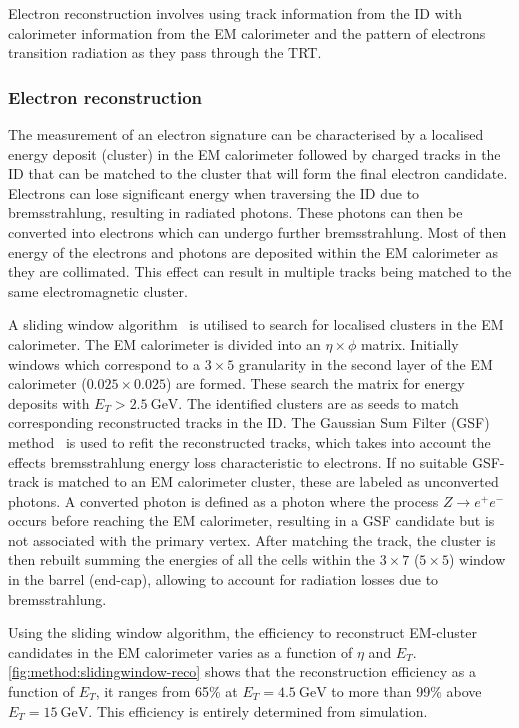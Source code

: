 Electron reconstruction involves using track information from the ID with calorimeter information from the EM calorimeter and the pattern of electrons transition radiation as they pass through the TRT.

\subsubsection{Electron reconstruction}
The measurement of an electron signature can be characterised by a localised energy deposit (cluster) in the EM calorimeter followed by charged tracks in the ID that can be matched to the cluster that will form the final electron candidate. Electrons can lose significant energy when traversing the ID due to bremsstrahlung, resulting in radiated photons. These photons can then be converted into electrons which can undergo further bremsstrahlung. Most of then energy of the electrons and photons are deposited within the EM calorimeter as they are collimated. This effect can result in multiple tracks being matched to the same electromagnetic cluster. 

A sliding window algorithm~\cite{slidingwindow} is utilised to search for localised clusters in the EM calorimeter. The EM calorimeter is divided into an $\eta \times \phi$ matrix. Initially windows which correspond to a $3 \times 5$ granularity in the second layer of the EM calorimeter ($0.025 \times 0.025$) are formed. These search the matrix for energy deposits with $E_T > \SI{2.5}{\giga\electronvolt}$. The identified clusters are as seeds to match corresponding reconstructed tracks in the ID. The Gaussian Sum Filter (GSF) method~\cite{ATLAS:CONF-2012-047} is used to refit the reconstructed tracks, which takes into account the effects bremsstrahlung energy loss characteristic to electrons. If no suitable GSF-track is matched to an EM calorimeter cluster, these are labeled as unconverted photons. A converted photon is defined as a photon where the process $Z \rightarrow e^+e^-$ occurs before reaching the EM calorimeter, resulting in a GSF candidate but is not associated with the primary vertex. After matching the track, the cluster is then rebuilt summing the energies of all the cells within the $3 \times 7$ ($5 \times 5$) window in the barrel (end-cap), allowing to account for radiation losses due to bremsstrahlung. 

Using the sliding window algorithm, the efficiency to reconstruct EM-cluster candidates in the EM calorimeter varies as a function of $\eta$ and $E_T$. \cref{fig:method:slidingwindow-reco} shows that the reconstruction efficiency as a function of $E_T$, it ranges from 65\% at $E_T = \SI{4.5}{\giga\electronvolt}$ to more than 99\% above $E_T = \SI{15}{\giga\electronvolt}$. This efficiency is entirely determined from simulation.

